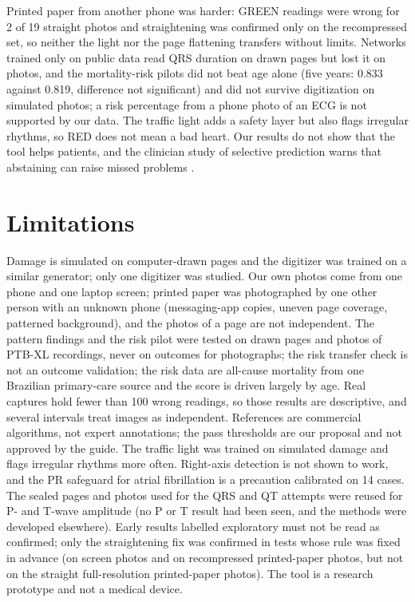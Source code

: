 \documentclass[conference]{IEEEtran}
\begin{document}
Printed paper from another phone was harder: GREEN readings were wrong for 2 of 19 straight photos and straightening was confirmed only on the recompressed set, so neither the light nor the page flattening transfers without limits. Networks trained only on public data read QRS duration on drawn pages but lost it on photos, and the mortality-risk pilots did not beat age alone (five years: 0.833 against 0.819, difference not significant) and did not survive digitization on simulated photos; a risk percentage from a phone photo of an ECG is not supported by our data. The traffic light adds a safety layer but also flags irregular rhythms, so RED does not mean a bad heart. Our results do not show that the tool helps patients, and the clinician study of selective prediction warns that abstaining can raise missed problems \cite{ref26}.

\section{Limitations}
Damage is simulated on computer-drawn pages and the digitizer was trained on a similar generator; only one digitizer was studied. Our own photos come from one phone and one laptop screen; printed paper was photographed by one other person with an unknown phone (messaging-app copies, uneven page coverage, patterned background), and the photos of a page are not independent. The pattern findings and the risk pilot were tested on drawn pages and photos of PTB-XL recordings, never on outcomes for photographs; the risk transfer check is not an outcome validation; the risk data are all-cause mortality from one Brazilian primary-care source and the score is driven largely by age. Real captures hold fewer than 100 wrong readings, so those results are descriptive, and several intervals treat images as independent. References are commercial algorithms, not expert annotations; the pass thresholds are our proposal and not approved by the guide. The traffic light was trained on simulated damage and flags irregular rhythms more often. Right-axis detection is not shown to work, and the PR safeguard for atrial fibrillation is a precaution calibrated on 14 cases. The sealed pages and photos used for the QRS and QT attempts were reused for P- and T-wave amplitude (no P or T result had been seen, and the methods were developed elsewhere). Early results labelled exploratory must not be read as confirmed; only the straightening fix was confirmed in tests whose rule was fixed in advance (on screen photos and on recompressed printed-paper photos, but not on the straight full-resolution printed-paper photos). The tool is a research prototype and not a medical device.
\end{document}
